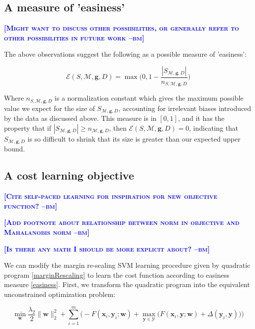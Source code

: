 \documentclass{article} %
\newcommand{\bmcomment}[1]{\textcolor{blue}{\textsc{\textbf{[#1 --bm]}}}}
\begin{document}
\subsection{A measure of 'easiness'}

\bmcomment{Might want to discuss other possibilities, or generally
refer to other possibilities in future work}

The above observations suggest the following as a possible 
measure of 'easiness':

\begin{equation}
\label{easiness}
\mathcal{E}(S,\mathcal{M},\mathbf{g},D)=\max\bigg(0, 1-\frac{|S_{\mathcal{M},\mathbf{g},D}|}{n_{S,\mathcal{M},\mathbf{g},D}}\bigg)
\end{equation}

Where $n_{S,\mathcal{M},\mathbf{g},D}$ is a normalization constant which
gives the maximum possible value we expect for the size of 
$S_{\mathcal{M},\mathbf{g},D}$, accounting for irrelevant biases
introduced by the data as discussed above.  This measure is in
$[0,1]$, and it has the property that if 
$|S_{\mathcal{M},\mathbf{g},D}|\geq n_{\mathcal{M},\mathbf{g},D}$,
then $\mathcal{E}(S,\mathcal{M},\mathbf{g},D)=0$, indicating that
$S_{\mathcal{M},\mathbf{g},D}$ is so difficult to shrink that its
size is greater than our expected upper bound.

\subsection{A cost learning objective}

\bmcomment{Cite self-paced learning for inspiration for new objective function?}

\bmcomment{Add footnote about relationship between norm in objective and
Mahalanobis norm}

\bmcomment{Is there any math I should be more explicit about?}

We can modify the margin re-scaling SVM learning procedure given by 
quadratic program \ref{marginRescaling} to learn the cost function 
according to easiness measure \ref{easiness}.
First, we transform the quadratic program
into the equivalent unconstrained optimization problem:

\begin{equation}
\label{svmObjective}
\min_{\mathbf{w}} \frac{\lambda_2}{2}\|\mathbf{w}\|_2^2 + \sum_{i=1}^m\bigg(-F(\mathbf{x}_i,\mathbf{y}_i;\mathbf{w})+\max_{\mathbf{y}\in \mathcal{Y}}\Big(F(\mathbf{x}_i,\mathbf{y};\mathbf{w})+\Delta(\mathbf{y}_i,\mathbf{y})\Big)\bigg)
\end{equation}
\end{document}

